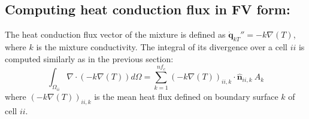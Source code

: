 \subsection{Computing heat conduction flux in FV form:}


The heat conduction flux vector of the mixture is defined as $\dot{\mathbf{q}}_{kT}''= -k \nabla(T)$, where $k$ is the mixture conductivity. The integral of its divergence over a cell $ii$ is computed similarly as in the previous section:
\begin{equation}
    \int_{\Omega_{ii}} {\nabla \cdot \left(-k \nabla(T)\right)} d\Omega = \sum_{k=1}^{nf_c} \left(-k \nabla(T) \right)_{ii,k} \cdot \hat{\mathbf{n}}_{ii,k}  \: A_k
\end{equation}
where $\left(-k \nabla(T) \right)_{ii,k}$ is the mean heat flux defined on boundary surface $k$ of cell $ii$.






